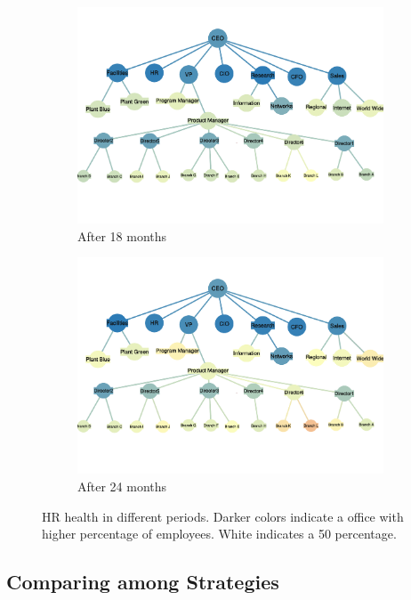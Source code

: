 \documentclass[tcn = 37075, sheet = false, abstract = false]{mcmthesis}
\begin{document}
\begin{figure}[t!]
\begin{subfigure}[h]{0.45\textwidth}
                \includegraphics[width=\textwidth]{figures/18.pdf}
                \caption{After 18 months}
        \end{subfigure}%
        \begin{subfigure}[h]{0.45\textwidth}
                \includegraphics[width=\textwidth]{figures/24.pdf}
                \caption{After 24 months}
        \end{subfigure}
        \caption{HR health in different periods. Darker colors indicate a office with higher percentage of employees. White indicates a 50 percentage.}
        \label{fig:hr-health}
\end{figure}


\subsection{Comparing among Strategies}
\end{document}
